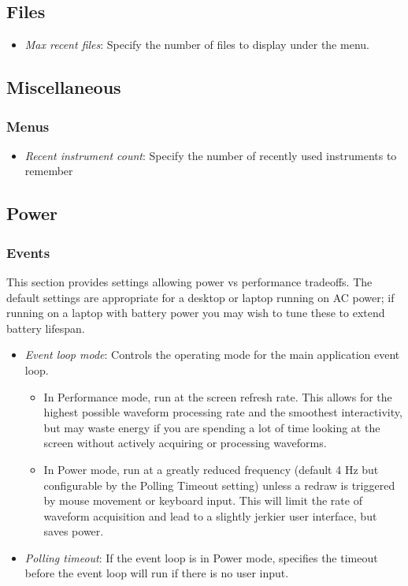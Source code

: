 \subsection{Files}

\begin{itemize}
\item \emph{Max recent files}: Specify the number of files to display under the  menu.
\end{itemize}

\subsection{Miscellaneous}

\subsubsection{Menus}

\begin{itemize}
\item \emph{Recent instrument count}: Specify the number of recently used instruments to remember
\end{itemize}

\subsection{Power}

\subsubsection{Events}

This section provides settings allowing power vs performance tradeoffs. The default settings are appropriate for a
desktop or laptop running on AC power; if running on a laptop with battery power you may wish to tune these to extend
battery lifespan.

\begin{itemize}
\item \emph{Event loop mode}: Controls the operating mode for the main application event loop.
\begin{itemize}
\item In Performance mode, run at the screen refresh rate. This allows for the highest possible waveform processing rate
and the smoothest interactivity, but may waste energy if you are spending a lot of time looking at the screen without
actively acquiring or processing waveforms.
\item In Power mode, run at a greatly reduced frequency (default 4 Hz but configurable by the Polling Timeout setting)
unless a redraw is triggered by mouse movement or keyboard input. This will limit the rate of waveform acquisition and
lead to a slightly jerkier user interface, but saves power.
\end{itemize}
\item \emph{Polling timeout}: If the event loop is in Power mode, specifies the timeout before the event loop will run
if there is no user input.
\end{itemize}

